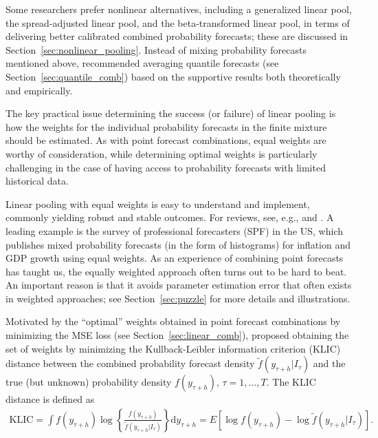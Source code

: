 \documentclass[a4paper,11pt]{article}
\begin{document}
Some researchers prefer nonlinear alternatives, including a generalized linear pool, the spread-adjusted linear pool, and the beta-transformed linear pool, in terms of delivering better calibrated combined probability forecasts; these are discussed in Section~\ref{sec:nonlinear_pooling}. Instead of mixing probability forecasts mentioned above, \citet{Lichtendahl2013-rt} recommended averaging quantile forecasts (see Section~\ref{sec:quantile_comb}) based on the supportive results both theoretically and empirically.

The key practical issue determining the success (or failure) of linear pooling is how the weights for the individual probability forecasts in the finite mixture should be estimated. As with point forecast combinations, equal weights are worthy of consideration, while determining optimal weights is particularly challenging in the case of having access to probability forecasts with limited historical data.

Linear pooling with equal weights is easy to understand and implement, commonly yielding robust and stable outcomes. For reviews, see, e.g., \citet{Wallis2005-yf} and \citet{OHagan2006-jk}. A leading example is the survey of professional forecasters (SPF) in the US, which publishes mixed probability forecasts (in the form of histograms) for inflation and GDP growth using equal weights. As an experience of combining point forecasts has taught us, the equally weighted approach often turns out to be hard to beat. An important reason is that it avoids parameter estimation error that often exists in weighted approaches; see Section~\ref{sec:puzzle} for more details and illustrations.

Motivated by the ``optimal'' weights obtained in point forecast combinations by minimizing the MSE loss (see Section~\ref{sec:linear_comb}), \citet{Hall2007-lh} proposed obtaining the set of weights by minimizing the Kullback-Leibler information criterion (KLIC) distance between the combined probability forecast density $\tilde{f}(y_{\tau+h}|I_{\tau})$ and the true (but unknown) probability density $f(y_{\tau+h})$, $\tau=1,\dots,T$. The KLIC distance is defined as
\begin{align*}
  \mathrm{KLIC} = \int f(y_{\tau+h}) \log \left\{\frac{f(y_{\tau+h})}{\tilde{f}(y_{\tau+h}|I_{\tau})}\right\} \mathrm{d} y_{\tau+h}
                =E\left[\log f(y_{\tau+h})-\log \tilde{f}(y_{\tau+h}|I_{\tau})\right].
\end{align*}
\end{document}

